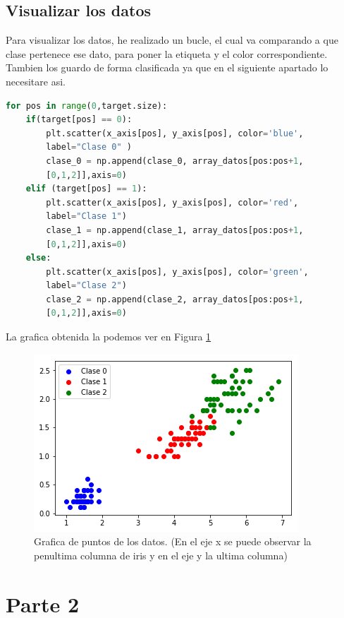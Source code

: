 \documentclass[12pt,a4paper]{article}
\begin{document}
\subsection{Visualizar los datos}
Para visualizar los datos, he realizado un bucle, el cual va comparando a que clase pertenece ese dato, para poner la etiqueta y el color correspondiente. Tambien los guardo de forma clasificada ya que en el siguiente apartado lo necesitare asi. 
\begin{lstlisting}[language=Python]
for pos in range(0,target.size):
    if(target[pos] == 0):
        plt.scatter(x_axis[pos], y_axis[pos], color='blue', 
        label="Clase 0" )
        clase_0 = np.append(clase_0, array_datos[pos:pos+1,
        [0,1,2]],axis=0)
    elif (target[pos] == 1):
        plt.scatter(x_axis[pos], y_axis[pos], color='red', 
        label="Clase 1")
        clase_1 = np.append(clase_1, array_datos[pos:pos+1,
        [0,1,2]],axis=0)
    else:
        plt.scatter(x_axis[pos], y_axis[pos], color='green', 
        label="Clase 2")
        clase_2 = np.append(clase_2, array_datos[pos:pos+1,
        [0,1,2]],axis=0)\end{lstlisting}
La grafica obtenida la podemos ver en Figura \ref{figura1}
\begin{figure}[H]  %
\centering
\includegraphics{images/graficaPuntos.png}  %
\caption{Grafica de puntos de los datos. (En el eje x se puede observar la penultima columna de iris y en el eje y la ultima columna)}
\label{figura1}
 
\end{figure}
\section{Parte 2}
\end{document}
